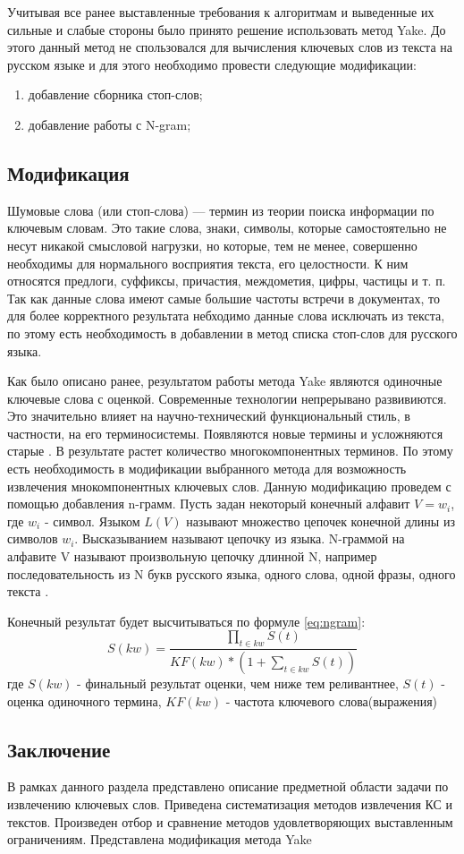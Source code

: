 Учитывая все ранее выставленные требования к алгоритмам и выведенные их сильные и слабые стороны было принято решение использовать метод Yake.
До этого данный метод не спользовался для вычисления ключевых слов из текста на русском языке и для этого необходимо провести следующие модификации:
\begin{enumerate}
	\item добавление сборника стоп-слов;
	\item добавление работы с N-gram;
\end{enumerate}

\subsection{Модификация}
Шумовые слова (или стоп-слова) — термин из теории поиска информации по ключевым словам.
Это такие слова, знаки, символы, которые самостоятельно не несут никакой смысловой нагрузки, но
которые, тем не менее, совершенно необходимы для нормального восприятия текста, его целостности.
К ним относятся предлоги, суффиксы, причастия, междометия, цифры, частицы и т. п.
Так как данные слова имеют самые большие частоты встречи в документах, то для более корректного результата небходимо данные слова исключать из текста, по этому есть необходимость в добавлении в метод списка стоп-слов для русского языка.

Как было описано ранее, результатом работы метода Yake являются одиночные ключевые слова с оценкой.
Современные технологии непрерывано развивиются.
Это значительно влияет на научно-технический функциональный стиль, в частности, на его терминосистемы.
Появляются новые термины и усложняются старые \cite{22}.
В результате растет количество многокомпонентных терминов.
По этому есть необходимость в модификации выбранного метода для возможность извлечения мнокомпонентных ключевых слов.
Данную модификацию проведем с помощью добавления n-грамм.
Пусть задан некоторый конечный алфавит $V = {w_i}$, где $w_i$ - символ. 
Языком $L(V)$ называют множество цепочек конечной длины из символов $w_i$.
Высказыванием называют цепочку из языка.
N-граммой на алфавите V называют произвольную цепочку длинной N, например последовательность из N букв русского языка, одного слова, одной фразы, одного текста \cite{21}.

Конечный результат будет высчитываться по формуле \eqref{eq:ngram}: 
\begin{equation}
	\label{eq:ngram}
	S(kw) = \frac{\prod_{t \in kw}S(t)}{KF(kw) * (1 + \sum_{t \in kw}S(t))}
\end{equation}
где $S(kw)$ - финальный результат оценки, чем ниже тем реливантнее, $S(t)$ - оценка одиночного термина,
$KF(kw)$ - частота ключевого слова(выражения)

\subsection{Заключение}
В рамках данного раздела представлено описание предметной области задачи по извлечению ключевых слов. Приведена систематизация методов извлечения КС и текстов.
Произведен отбор и сравнение методов удовлетворяющих выставленным ограничениям.
Представлена модификация метода Yake


